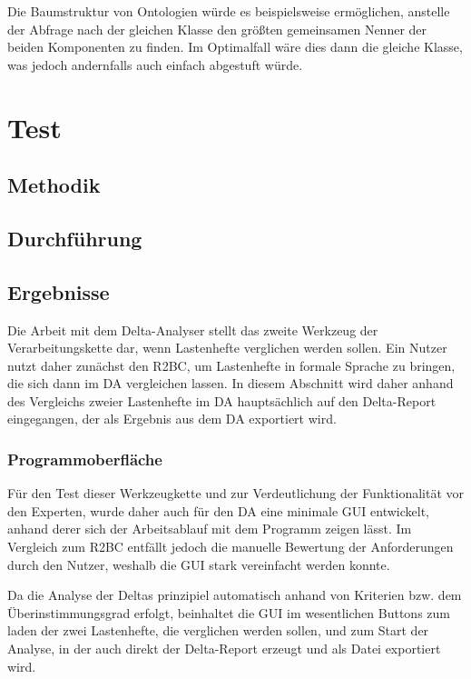 \documentclass[12pt]{report}
\begin{document}
Die Baumstruktur von Ontologien würde es beispielsweise ermöglichen, anstelle der Abfrage nach der gleichen Klasse den \glqq größten gemeinsamen Nenner\grqq{} der beiden Komponenten zu finden. Im Optimalfall wäre dies dann die gleiche Klasse, was jedoch andernfalls auch einfach abgestuft würde.


\section{Test}
\subsection{Methodik}
\subsection{Durchführung}
\subsection{Ergebnisse}
Die Arbeit mit dem Delta-Analyser stellt das zweite Werkzeug der Verarbeitungskette dar, wenn Lastenhefte verglichen werden sollen. Ein Nutzer nutzt daher zunächst den R2BC, um Lastenhefte in formale Sprache zu bringen, die sich dann im DA vergleichen lassen. In diesem Abschnitt wird daher anhand des Vergleichs zweier Lastenhefte im DA hauptsächlich auf den Delta-Report eingegangen, der als Ergebnis aus dem DA exportiert wird. 

\subsubsection{Programmoberfläche}
Für den Test dieser Werkzeugkette und zur Verdeutlichung der Funktionalität vor den Experten, wurde daher auch für den DA eine minimale GUI entwickelt, anhand derer sich der Arbeitsablauf mit dem Programm zeigen lässt. Im Vergleich zum R2BC entfällt jedoch die manuelle Bewertung der Anforderungen durch den Nutzer, weshalb die GUI stark vereinfacht werden konnte.

Da die Analyse der Deltas prinzipiel automatisch anhand von Kriterien bzw. dem Überinstimmungsgrad erfolgt, beinhaltet die GUI im wesentlichen Buttons zum laden der zwei Lastenhefte, die verglichen werden sollen, und zum Start der Analyse, in der auch direkt der Delta-Report erzeugt und als Datei exportiert wird.
\end{document}
